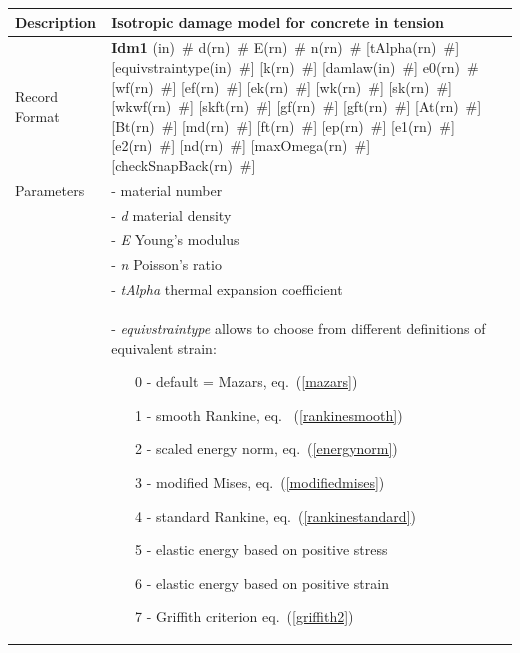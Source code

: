 \documentclass[a4paper]{article}
\newcommand{\descitem}[1]{{\noindent \bf #1}}
\newcommand{\elemparam}[2]{{{#1\tiny (#2)}~\#}}
\newcommand{\param}[1]{{\it #1}}
\begin{document}
\begin{longtable}{|l|p{9cm}|}
\hline
Description & Isotropic damage model for concrete in tension\\
\hline
Record Format & \descitem{Idm1} 
\elemparam{}{in} 
\elemparam{d}{rn} 
\elemparam{E}{rn}
\elemparam{n}{rn} 
[\elemparam{tAlpha}{rn}] 
[\elemparam{equivstraintype}{in}] 
[\elemparam{k}{rn}]
[\elemparam{damlaw}{in}] 
\elemparam{e0}{rn}
[\elemparam{wf}{rn}] 
[\elemparam{ef}{rn}]
[\elemparam{ek}{rn}]
[\elemparam{wk}{rn}]
[\elemparam{sk}{rn}]
[\elemparam{wkwf}{rn}]
[\elemparam{skft}{rn}]
[\elemparam{gf}{rn}]
[\elemparam{gft}{rn}]
[\elemparam{At}{rn}] 
[\elemparam{Bt}{rn}] 
[\elemparam{md}{rn}] 
[\elemparam{ft}{rn}] 
[\elemparam{ep}{rn}] 
[\elemparam{e1}{rn}] 
[\elemparam{e2}{rn}] 
[\elemparam{nd}{rn}] 
[\elemparam{maxOmega}{rn}]
[\elemparam{checkSnapBack}{rn}]\\
Parameters &- \param{} material number\\
&- \param{d} material density\\
&- \param{E} Young's modulus\\
&- \param{n} Poisson's ratio\\
&- \param{tAlpha} thermal expansion coefficient\\
&- \param{equivstraintype} allows to choose from different definitions
of equivalent strain:
\begin{itemize}\setlength{\itemsep}{-3pt}
\item[0 -] default = Mazars, eq.~(\ref{mazars})
\item[1 -] smooth Rankine, eq.~ (\ref{rankinesmooth})
\item[2 -] scaled energy norm,  eq.~(\ref{energynorm})
\item[3 -] modified Mises, eq.~(\ref{modifiedmises})
\item[4 -] standard Rankine, eq.~(\ref{rankinestandard})
\item[5 -] elastic energy based on positive stress
\item[6 -] elastic energy based on positive strain
\item[7 -] Griffith criterion eq.~(\ref{griffith2})


\end{itemize}
\end{longtable}
\end{document}
